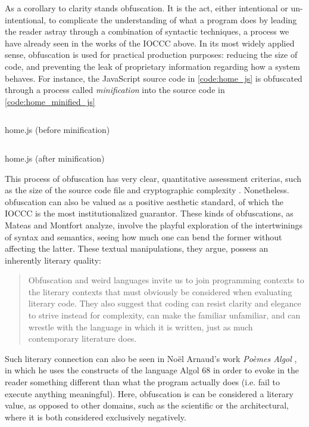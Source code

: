 As a corollary to clarity stands obfuscation. It is the act, either intentional or un-intentional, to complicate the understanding of what a program does by leading the reader astray through a combination of syntactic techniques, a process we have already seen in the works of the IOCCC above. In its most widely applied sense, obfuscation is used for practical production purposes: reducing the size of code, and preventing the leak of proprietary information regarding how a system behaves. For instance, the JavaScript source code in \ref{code:home_js} is obfuscated through a process called \emph{minification} into the source code in \ref{code:home_minified_js}

\begin{listing}
  \inputminted{js}{./corpus/home.js}
  \caption{home.js (before minification)}
  \label{code:home_js}
\end{listing}

\begin{listing}
  \inputminted{js}{./corpus/home_minified.js}
  \caption{home.js (after minification)}
  \label{code:home_minified_js}
\end{listing}

This process of obfuscation has very clear, quantitative assessment criterias, such as the size of the source code file and cryptographic complexity \citep{pellet-mary_co6gc_2020}. Nonetheless. obfuscation can also be valued as a positive aesthetic standard, of which the IOCCC is the most institutionalized guarantor. These kinds of obfuscations, as Mateas and Montfort analyze, involve the playful exploration of the intertwinings of syntax and semantics, seeing how much one can bend the former without affecting the latter. These textual manipulations, they argue, possess an inherently literary quality:

\begin{quote}
  Obfuscation and weird languages invite us to join programming contexts to the literary contexts that must obviously be considered when evaluating literary code. They also suggest that coding can resist clarity and elegance to strive instead for complexity, can make the familiar unfamiliar, and can wrestle with the language in which it is written, just as much contemporary literature does. \citep{mateas_box_2005}
\end{quote}

Such literary connection can also be seen in Noël Arnaud's work \emph{Poèmes Algol} \citep{arnaud_poemes_1968}, in which he uses the constructs of the language Algol 68 in order to evoke in the reader something different than what the program actually does (i.e. fail to execute anything meaningful). Here, obfuscation is can be considered a literary value, as opposed to other domains, such as the scientific or the architectural, where it is both considered exclusively negatively.

